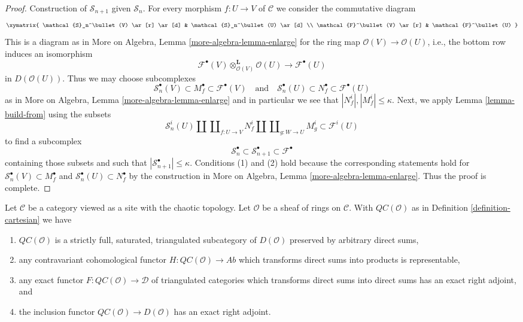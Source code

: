 \begin{proof}
\medskip\noindent
Construction of $\mathcal{S}_{n + 1}$ given $\mathcal{S}_n$.
For every morphism $f : U \to V$ of $\mathcal{C}$
we consider the commutative diagram
$$
\xymatrix{
\mathcal{S}_n^\bullet(V)
\ar[r] \ar[d] &
\mathcal{S}_n^\bullet(U) \ar[d] \\
\mathcal{F}^\bullet(V)
\ar[r] &
\mathcal{F}^\bullet(U)
}
$$
This is a diagram as in More on Algebra, Lemma \ref{more-algebra-lemma-enlarge}
for the ring map $\mathcal{O}(V) \to \mathcal{O}(U)$, i.e., the bottom row
induces an isomorphism
$$
\mathcal{F}^\bullet(V) \otimes_{\mathcal{O}(V)}^\mathbf{L} \mathcal{O}(U)
\longrightarrow
\mathcal{F}^\bullet(U)
$$
in $D(\mathcal{O}(U))$. Thus we may choose subcomplexes
$$
\mathcal{S}_n^\bullet(V) \subset M^\bullet_f \subset \mathcal{F}^\bullet(V)
\quad\text{and}\quad
\mathcal{S}_n^\bullet(U) \subset N^\bullet_f \subset \mathcal{F}^\bullet(U)
$$
as in More on Algebra, Lemma \ref{more-algebra-lemma-enlarge}
and in particular we see that $|N^i_f|, |M^i_f| \leq \kappa$. Next, we apply
Lemma \ref{lemma-build-from} using the subsets
$$
\mathcal{S}_n^i(U) \amalg \coprod\nolimits_{f : U \to V} N^i_f
\amalg \coprod\nolimits_{g : W \to U} M^i_g
\subset
\mathcal{F}^i(U)
$$
to find a subcomplex
$$
\mathcal{S}_n^\bullet \subset
\mathcal{S}_{n + 1}^\bullet \subset
\mathcal{F}^\bullet
$$
containing those subsets and such that
$|\mathcal{S}_{n + 1}^\bullet| \leq \kappa$.
Conditions (1) and (2) hold because the corresponding statements
hold for 
$\mathcal{S}_n^\bullet(V) \subset M^\bullet_f$ and
$\mathcal{S}_n^\bullet(U) \subset N^\bullet_f$ by the construction in
More on Algebra, Lemma \ref{more-algebra-lemma-enlarge}.
Thus the proof is complete.
\end{proof}

\begin{proposition}
\label{proposition-cartesian-brown}
Let $\mathcal{C}$ be a category viewed as a site with
the chaotic topology. Let $\mathcal{O}$ be a sheaf of rings on $\mathcal{C}$.
With $\mathit{QC}(\mathcal{O})$ as in
Definition \ref{definition-cartesian} we have
\begin{enumerate}
\item $\mathit{QC}(\mathcal{O})$ is a strictly full, saturated, triangulated
subcategory of $D(\mathcal{O})$ preserved by arbitrary direct sums,
\item any contravariant cohomological functor
$H : \mathit{QC}(\mathcal{O}) \to \textit{Ab}$
which transforms direct sums into products is representable,
\item any exact functor $F : \mathit{QC}(\mathcal{O}) \to \mathcal{D}$
of triangulated categories which transforms direct sums into direct sums
has an exact right adjoint, and
\item the inclusion functor $\mathit{QC}(\mathcal{O}) \to D(\mathcal{O})$ has
an exact right adjoint.
\end{enumerate}
\end{proposition}


